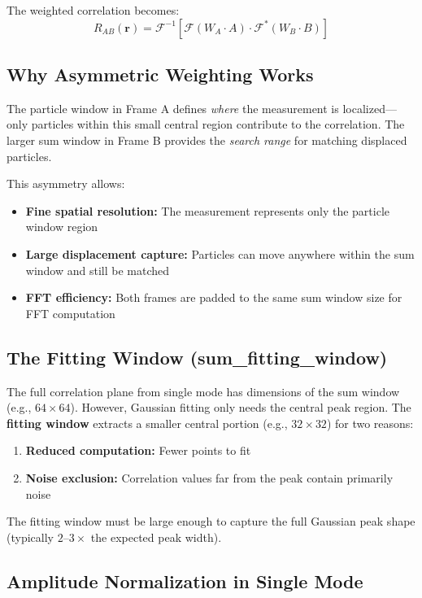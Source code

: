 \documentclass[11pt,a4paper]{article}
\begin{document}
The weighted correlation becomes:
\begin{equation}
    R_{AB}(\mathbf{r}) = \mathcal{F}^{-1}\left[ \mathcal{F}(W_A \cdot A) \cdot \mathcal{F}^*(W_B \cdot B) \right]
\end{equation}

\subsection{Why Asymmetric Weighting Works}

The particle window in Frame A defines \emph{where} the measurement is localized---only particles within this small central region contribute to the correlation. The larger sum window in Frame B provides the \emph{search range} for matching displaced particles.

This asymmetry allows:
\begin{itemize}
    \item \textbf{Fine spatial resolution:} The measurement represents only the particle window region
    \item \textbf{Large displacement capture:} Particles can move anywhere within the sum window and still be matched
    \item \textbf{FFT efficiency:} Both frames are padded to the same sum window size for FFT computation
\end{itemize}

\subsection{The Fitting Window (sum\_fitting\_window)}

The full correlation plane from single mode has dimensions of the sum window (e.g., $64 \times 64$). However, Gaussian fitting only needs the central peak region. The \textbf{fitting window} extracts a smaller central portion (e.g., $32 \times 32$) for two reasons:

\begin{enumerate}
    \item \textbf{Reduced computation:} Fewer points to fit
    \item \textbf{Noise exclusion:} Correlation values far from the peak contain primarily noise
\end{enumerate}

The fitting window must be large enough to capture the full Gaussian peak shape (typically $2$--$3\times$ the expected peak width).

\subsection{Amplitude Normalization in Single Mode}
\end{document}
